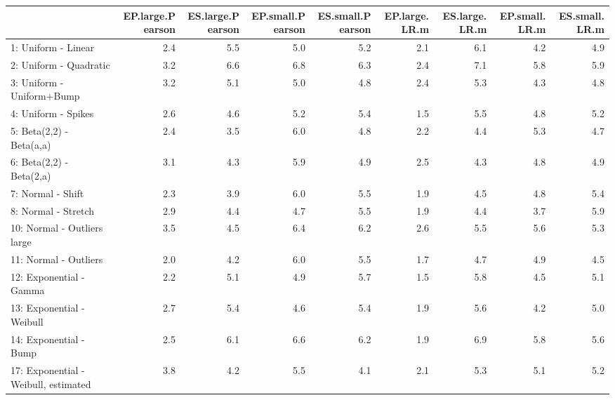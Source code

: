 \documentclass[
]{article}
\begin{document}
\begin{table}[H]
\centering\begingroup\fontsize{15}{17}\selectfont

\begin{tabular}{l|r|r|r|r|r|r|r|r}
\hline
  & EP.large.Pearson & ES.large.Pearson & EP.small.Pearson & ES.small.Pearson & EP.large.LR.m & ES.large.LR.m & EP.small.LR.m & ES.small.LR.m\\
\hline
1: Uniform - Linear & 2.4 & 5.5 & 5.0 & 5.2 & 2.1 & 6.1 & 4.2 & 4.9\\
\hline
2: Uniform - Quadratic & 3.2 & 6.6 & 6.8 & 6.3 & 2.4 & 7.1 & 5.8 & 5.9\\
\hline
3: Uniform - Uniform+Bump & 3.2 & 5.1 & 5.0 & 4.8 & 2.4 & 5.3 & 4.3 & 4.8\\
\hline
4: Uniform - Spikes & 2.6 & 4.6 & 5.2 & 5.4 & 1.5 & 5.5 & 4.8 & 5.2\\
\hline
5: Beta(2,2) - Beta(a,a) & 2.4 & 3.5 & 6.0 & 4.8 & 2.2 & 4.4 & 5.3 & 4.7\\
\hline
6: Beta(2,2) - Beta(2,a) & 3.1 & 4.3 & 5.9 & 4.9 & 2.5 & 4.3 & 4.8 & 4.9\\
\hline
7: Normal - Shift & 2.3 & 3.9 & 6.0 & 5.5 & 1.9 & 4.5 & 4.8 & 5.4\\
\hline
8: Normal  - Stretch & 2.9 & 4.4 & 4.7 & 5.5 & 1.9 & 4.4 & 3.7 & 5.9\\
\hline
10: Normal  - Outliers large & 3.5 & 4.5 & 6.4 & 6.2 & 2.6 & 5.5 & 5.6 & 5.3\\
\hline
11: Normal  - Outliers & 2.0 & 4.2 & 6.0 & 5.5 & 1.7 & 4.7 & 4.9 & 4.5\\
\hline
12: Exponential - Gamma & 2.2 & 5.1 & 4.9 & 5.7 & 1.5 & 5.8 & 4.5 & 5.1\\
\hline
13: Exponential - Weibull & 2.7 & 5.4 & 4.6 & 5.4 & 1.9 & 5.6 & 4.2 & 5.0\\
\hline
14: Exponential - Bump & 2.5 & 6.1 & 6.6 & 6.2 & 1.9 & 6.9 & 5.8 & 5.6\\
\hline
17: Exponential - Weibull, estimated & 3.8 & 4.2 & 5.5 & 4.1 & 2.1 & 5.3 & 5.1 & 5.2\\
\hline
\end{tabular}
\endgroup{}
\end{table}
\end{document}
